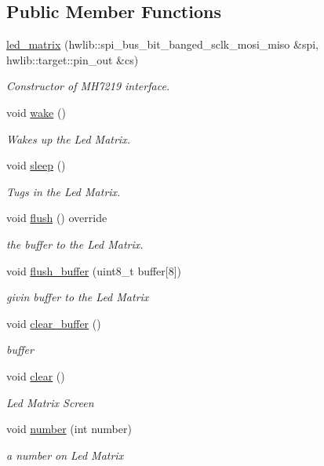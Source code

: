 \subsection*{Public Member Functions}
\begin{DoxyCompactItemize}
\item 
\hyperlink{classled__matrix_a4b06df3b2766cfde525f14e545d42178}{led\+\_\+matrix} (hwlib\+::spi\+\_\+bus\+\_\+bit\+\_\+banged\+\_\+sclk\+\_\+mosi\+\_\+miso \&spi, hwlib\+::target\+::pin\+\_\+out \&cs)
\begin{DoxyCompactList}\small\item\em Constructor of M\+H7219 interface. \end{DoxyCompactList}\item 
void \hyperlink{classled__matrix_aaaf3d4913c14f5c4f3fda0bab4d2c2d7}{wake} ()
\begin{DoxyCompactList}\small\item\em Wakes up the Led Matrix. \end{DoxyCompactList}\item 
void \hyperlink{classled__matrix_ac926b398f60702bf06e1c6582c04ed6e}{sleep} ()
\begin{DoxyCompactList}\small\item\em Tugs in the Led Matrix. \end{DoxyCompactList}\item 
void \hyperlink{classled__matrix_a074e1d86a05e2e67a3c329d589b601b8}{flush} () override
\begin{DoxyCompactList}\small\item\em the buffer to the Led Matrix. \end{DoxyCompactList}\item 
void \hyperlink{classled__matrix_a0916fce5a976a46da16204265332015f}{flush\+\_\+buffer} (uint8\+\_\+t buffer\mbox{[}8\mbox{]})
\begin{DoxyCompactList}\small\item\em givin buffer to the Led Matrix \end{DoxyCompactList}\item 
void \hyperlink{classled__matrix_af26ac982e5c74a357f5fe18e73b819e4}{clear\+\_\+buffer} ()
\begin{DoxyCompactList}\small\item\em buffer \end{DoxyCompactList}\item 
void \hyperlink{classled__matrix_ac92b3805e1af58f4591bf22402c11d7e}{clear} ()
\begin{DoxyCompactList}\small\item\em Led Matrix Screen \end{DoxyCompactList}\item 
void \hyperlink{classled__matrix_a97602fdecff69971987941e12bc52a0f}{number} (int number)
\begin{DoxyCompactList}\small\item\em a number on Led Matrix \end{DoxyCompactList}\end{DoxyCompactItemize}


